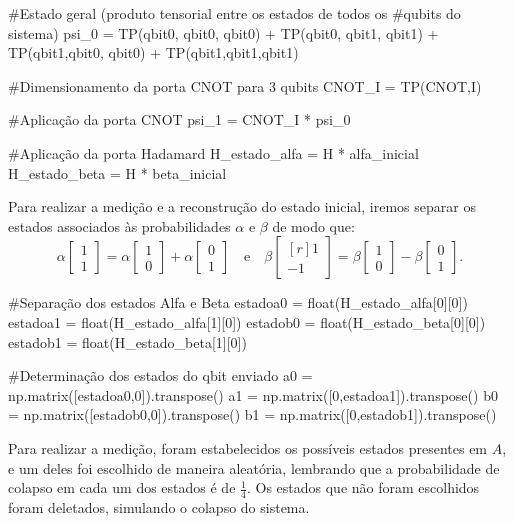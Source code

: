 \begin{pycode}
    #Estado geral (produto tensorial entre os estados de todos os
    #qubits do sistema)
    psi_0 = TP(qbit0, qbit0, qbit0) + TP(qbit0, qbit1, qbit1) +
            TP(qbit1,qbit0, qbit0) + TP(qbit1,qbit1,qbit1)

    #Dimensionamento da porta CNOT para 3 qubits
    CNOT_I = TP(CNOT,I)

    #Aplicação da porta CNOT
    psi_1 = CNOT_I * psi_0

    #Aplicação da porta Hadamard
    H_estado_alfa = H * alfa_inicial
    H_estado_beta = H * beta_inicial
\end{pycode}

Para realizar a medição e a reconstrução do estado inicial, iremos separar os estados associados às probabilidades \(\alpha\) e \(\beta\) de modo que:
\[
  \alpha \begin{bmatrix} 1 \\ 1 \end{bmatrix} = \alpha \begin{bmatrix} 1 \\ 0 \end{bmatrix} + \alpha \begin{bmatrix} 0 \\ 1 \end{bmatrix}
  \quad \text{e} \quad
  \beta \begin{bmatrix*}[r] 1 \\ -1 \end{bmatrix*} = \beta \begin{bmatrix} 1 \\ 0 \end{bmatrix} - \beta \begin{bmatrix} 0 \\ 1 \end{bmatrix}.
\]

\begin{pycode}
    #Separação dos estados Alfa e Beta
    estadoa0 = float(H_estado_alfa[0][0])
    estadoa1 = float(H_estado_alfa[1][0])
    estadob0 = float(H_estado_beta[0][0])
    estadob1 = float(H_estado_beta[1][0])

    #Determinação dos estados do qbit enviado
    a0 = np.matrix([estadoa0,0]).transpose()
    a1 = np.matrix([0,estadoa1]).transpose()
    b0 = np.matrix([estadob0,0]).transpose()
    b1 = np.matrix([0,estadob1]).transpose()
\end{pycode}

Para realizar a medição, foram estabelecidos os possíveis estados presentes em \(A\), e um deles foi escolhido de maneira aleatória, lembrando que a probabilidade de colapso em cada um dos estados é de \(\frac{1}{4}\). Os estados que não foram escolhidos foram deletados, simulando o colapso do sistema.

